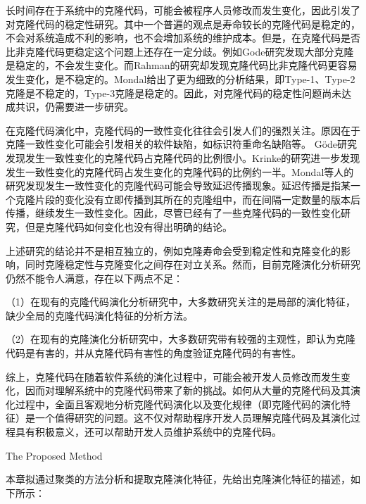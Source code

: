 长时间存在于系统中的克隆代码，可能会被程序人员修改而发生变化，因此引发了对克隆代码的稳定性研究。其中一个普遍的观点是寿命较长的克隆代码是稳定的\cite{krinke2008cloned,gode2011clone,harder2013cloned}，不会对系统造成不利的影响，也不会增加系统的维护成本。但是，在克隆代码是否比非克隆代码更稳定这个问题上还存在一定分歧。例如Gode研究发现大部分克隆是稳定的，不会发生变化\cite{gode2011frequency}。而Rahman的研究却发现克隆代码比非克隆代码更容易发生变化，是不稳定的\cite{rahman2014change}。Mondal给出了更为细致的分析结果，即Type-1、Type-2克隆是不稳定的，Type-3克隆是稳定的\cite{mondal2012comparative,mondal2012dispersion}。因此，对克隆代码的稳定性问题尚未达成共识，仍需要进一步研究。

在克隆代码演化中，克隆代码的一致性变化往往会引发人们的强烈关注。原因在于克隆一致性变化可能会引发相关的软件缺陷，如标识符重命名缺陷等。 G{\"o}de研究发现发生一致性变化的克隆代码占克隆代码的比例很小\cite{gode2011frequency}。Krinke的研究进一步发现发生一致性变化的克隆代码占发生变化的克隆代码的比例约一半\cite{krinke2007study}。Mondal等人的研究发现发生一致性变化的克隆代码可能会导致延迟传播现象。延迟传播是指某一个克隆片段的变化没有立即传播到其所在的克隆组中，而在间隔一定数量的版本后传播，继续发生一致性变化\cite{mondal2016comparative}。因此，尽管已经有了一些克隆代码的一致性变化研究，但是克隆代码如何变化也没有得出明确的结论。

上述研究的结论并不是相互独立的，例如克隆寿命会受到稳定性和克隆变化的影响，同时克隆稳定性与克隆变化之间存在对立关系。然而，目前克隆演化分析研究仍然不能令人满意，存在以下两点不足：

（1）在现有的克隆代码演化分析研究中，大多数研究关注的是局部的演化特征，缺少全局的克隆代码演化特征的分析方法。

（2）在现有的克隆演化分析研究中，大多数研究带有较强的主观性，即认为克隆代码是有害的，并从克隆代码有害性的角度验证克隆代码的有害性。%

综上，克隆代码在随着软件系统的演化过程中，可能会被开发人员修改而发生变化，因而对理解系统中的克隆代码带来了新的挑战。如何从大量的克隆代码及其演化过程中，全面且客观地分析克隆代码演化以及变化规律（即克隆代码的演化特征）是一个值得研究的问题。这不仅对帮助程序开发人员理解克隆代码及其演化过程具有积极意义，还可以帮助开发人员维护系统中的克隆代码。

{The Proposed Method}

本章拟通过聚类的方法分析和提取克隆演化特征，先给出克隆演化特征的描述，如下所示：

